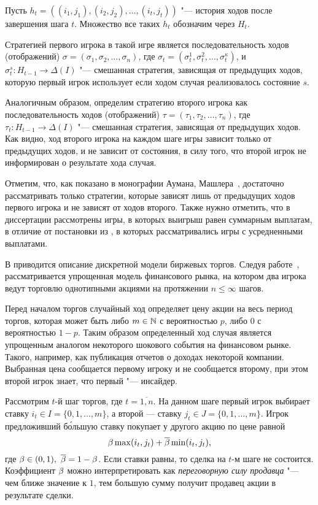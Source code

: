Пусть $h_t = \left((i_1, j_1), (i_2, j_2), \ldots, (i_t, j_t)\right)$ "--- история ходов после завершения шага $t$.
Множество все таких $h_t$ обозначим через $H_t$. 

Стратегией первого игрока в такой игре является последовательность ходов (отображений) $\sigma = (\sigma_1, \sigma_2, \ldots, \sigma_n)$, где $\sigma_t = (\sigma^1_t, \sigma^2_t, \ldots, \sigma^\kappa_t)$, и $\sigma^s_t: H_{t-1} \rightarrow \Delta(I)$ "--- смешанная стратегия, зависящая от предыдущих ходов, которую первый игрок использует если ходом случая реализовалось состояние $s$.

Аналогичным образом, определим стратегию второго игрока как последовательность ходов (отображений) $\tau = (\tau_1, \tau_2, \ldots, \tau_n)$, где $\tau_t: H_{t-1} \rightarrow \Delta(I)$ "--- смешанная стратегия, зависящая от предыдущих ходов.
Как видно, ход второго игрока на каждом шаге игры зависит только от предыдущих ходов, и не зависит от состояния, в силу того, что второй игрок не информирован о результате хода случая.

Отметим, что, как показано в монографии Аумана, Машлера~\cite{aumann95}, достаточно рассматривать только стратегии, которые зависят лишь от предыдущих ходов первого игрока и не зависят от ходов второго.
%
Также нужно отметить, что в диссертации рассмотрены игры, в которых выигрыш равен суммарным выплатам, в отличие от постановки из \cite{aumann95}, в которых рассматривались игры с усредненными выплатами.

В  приводится описание дискретной модели биржевых торгов.
Следуя работе~\cite{domansky07}, рассматривается упрощенная модель финансового рынка, на котором два игрока ведут торговлю однотипными акциями на протяжении $n \leqslant \infty$ шагов.

Перед началом торгов случайный ход определяет цену акции на весь период торгов, которая может быть либо $m \in \mathbb{N}$ с вероятностью $p$, либо $0$ с вероятностью $1-p$.
Таким образом определенный ход случая является упрощенным аналогом некоторого шокового события на финансовом рынке.
Такого, например, как публикация отчетов о доходах некоторой компании.
Выбранная цена сообщается первому игроку и не сообщается второму, при этом второй игрок знает, что первый "--- инсайдер.

Рассмотрим $t$-й шаг торгов, где $t = \overline{1,n}$.
На данном шаге первый игрок выбирает ставку $i_t \in I = \{0, 1, \ldots, m\}$, а второй --- ставку $j_t \in J = \{0, 1, \ldots, m\}$.
Игрок предложивший б\'{о}льшую ставку покупает у другого акцию по цене равной
\[
  \beta \max(i_t, j_t) + {\overline{\beta}} \min(i_t, j_t),
\]
где $\beta \in (0, 1),\ {\overline{\beta}} = 1 - \beta$.
Если ставки равны, то сделка на $t$-м шаге не состоится.
Коэффициент $\beta$ можно интерпретировать как \emph{переговорную силу продавца} "--- чем ближе значение к $1$, тем большую сумму получит продавец акции в результате сделки.


